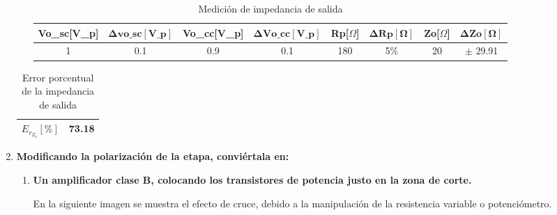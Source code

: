 \begin{enumerate}
\begin{itemize}
                \begin{table}[H]
                  \centering
                  \begin{tabular}{|c|c|c|c|c|c|c|c|}
                    \hline
                    \textbf{Vo\_sc[V\_p]} & $\mathbf{\Delta vo\_sc[V\_p]}$ & \textbf{Vo\_cc[V\_p]} & $\mathbf{\Delta Vo\_cc[V\_p]}$ & \textbf{Rp[$\Omega$]} & $\mathbf{\Delta Rp[\Omega]}$ & \textbf{Zo[$\Omega$]} & $\mathbf{\Delta Zo[\Omega]}$ \\
                    \hline
                    1                     & 0.1                            & 0.9                   & 0.1                            & 180                   & 5\%                          & 20                    & $\pm$ 29.91                  \\
                    \hline
                  \end{tabular}
                  \caption{Medición de impedancia de salida}
                  \label{tab:med_zo_ep}
                \end{table}
        \end{itemize}

        \begin{table}[H]
          \centering
          \begin{tabular}{|c|c|}
            \hline
            $E_{r_{Z_{o}}} [\%]$ & 73.18 \\
            \hline
          \end{tabular}
          \caption{Error porcentual de la impedancia de salida}
          \label{tab:error_porcentual1_zo}
        \end{table}


  \item \textbf{Modificando la polarización de la etapa, conviértala en:}
        \begin{enumerate}
          \item \textbf{Un amplificador clase B, colocando los transistores
                  de potencia justo en la zona de corte.}

                En la siguiente imagen se muestra el efecto de cruce, debido a la manipulación de la resistencia variable o potenciómetro.


\end{enumerate}
\end{enumerate}
